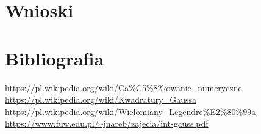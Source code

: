 \documentclass[11pt]{scrartcl}
\begin{document}
    \section{Wnioski}

    \section{Bibliografia}
    \url{https://pl.wikipedia.org/wiki/Ca%C5%82kowanie_numeryczne} \\
    \url{https://pl.wikipedia.org/wiki/Kwadratury_Gaussa} \\
    \url{https://pl.wikipedia.org/wiki/Wielomiany_Legendre%E2%80%99a} \\
    \url{https://www.fuw.edu.pl/~jnareb/zajecia/int-gauss.pdf}
\end{document}
